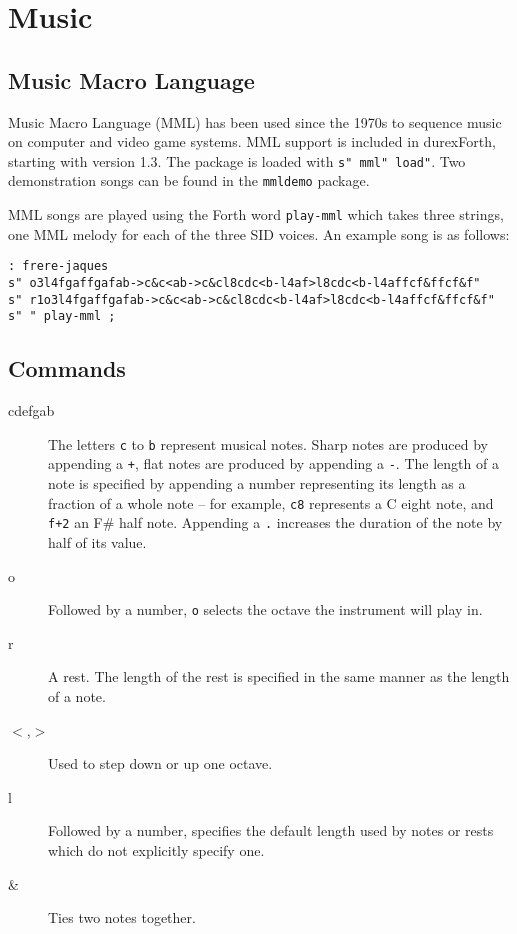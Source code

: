 \chapter{Music}

\section{Music Macro Language}

Music Macro Language (MML) has been used since the 1970s to sequence music on computer and video game systems. MML support is included in durexForth, starting with version 1.3. The package is loaded with \texttt{s" mml" load"}. Two demonstration songs can be found in the \texttt{mmldemo} package.

MML songs are played using the Forth word \texttt{play-mml} which takes three strings, one MML melody for each of the three SID voices. An example song is as follows:

\begin{verbatim}
: frere-jaques
s" o3l4fgaffgafab->c&c<ab->c&cl8cdc<b-l4af>l8cdc<b-l4affcf&ffcf&f"
s" r1o3l4fgaffgafab->c&c<ab->c&cl8cdc<b-l4af>l8cdc<b-l4affcf&ffcf&f"
s" " play-mml ;
\end{verbatim}

\section{Commands}

\begin{description}
\item[cdefgab] The letters \texttt{c} to \texttt{b} represent musical notes. Sharp notes are produced by appending a \texttt{+}, flat notes are produced by appending a \texttt{-}. The length of a note is specified by appending a number representing its length as a fraction of a whole note -- for example, \texttt{c8} represents a C eight note, and \texttt{f+2} an F\# half note. Appending a \texttt{.} increases the duration of the note by half of its value.
\item[o] Followed by a number, \texttt{o} selects the octave the instrument will play in.
\item[r] A rest. The length of the rest is specified in the same manner as the length of a note.
\item[$<$,$>$] Used to step down or up one octave.
\item[l] Followed by a number, specifies the default length used by notes or rests which do not explicitly specify one.
\item[\&] Ties two notes together.
\end{description}
